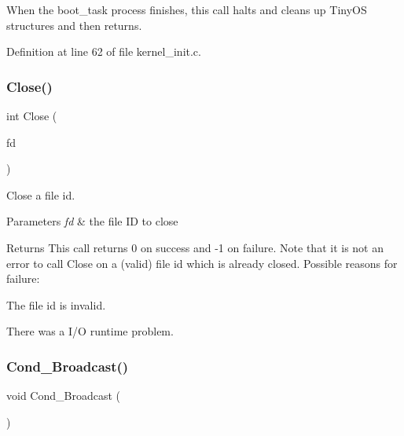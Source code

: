 When the boot\+\_\+task process finishes, this call halts and cleans up Tiny\+OS structures and then returns. 

Definition at line 62 of file kernel\+\_\+init.\+c.

\mbox{\label{group__syscalls_ga82187e2e98af053a2ab6cb516e9e7f5a}} 
\subsubsection{\texorpdfstring{Close()}{Close()}}
{\footnotesize\ttfamily int Close (\begin{DoxyParamCaption}\item[{\hyperlink{group__syscalls_ga5097222c5f0da97d92d4712359abc38f}{Fid\+\_\+t}}]{fd }\end{DoxyParamCaption})}



Close a file id. 


\begin{DoxyParams}{Parameters}
{\em fd} & the file ID to close \\
\hline
\end{DoxyParams}
\begin{DoxyReturn}{Returns}
This call returns 0 on success and -\/1 on failure. Note that it is not an error to call Close on a (valid) file id which is already closed. Possible reasons for failure\+:
\begin{DoxyItemize}
\item The file id is invalid.
\item There was a I/O runtime problem. 
\end{DoxyItemize}
\end{DoxyReturn}
\mbox{\label{group__syscalls_ga8196aa2a48cad90742f254cc3b8fd351}} 
\subsubsection{\texorpdfstring{Cond\+\_\+\+Broadcast()}{Cond\_Broadcast()}}
{\footnotesize\ttfamily void Cond\+\_\+\+Broadcast (\begin{DoxyParamCaption}\item[{\hyperlink{structCondVar}{Cond\+Var} $\ast$}]{ }\end{DoxyParamCaption})}




